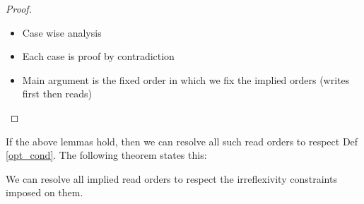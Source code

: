         \begin{proof}
            \begin{itemize}
                \item Case wise analysis
                \item Each case is proof by contradiction
                \item Main argument is the fixed order in which we fix the implied orders (writes first then reads)
            \end{itemize}    
        \end{proof}

        If the above lemmas hold, then we can resolve all such read orders to respect Def \ref{opt_cond}.
        The following theorem states this:
        \begin{theorem}
            \label{fwdprog-iro}
            We can resolve all implied read orders to respect the irreflexivity constraints imposed on them.
        \end{theorem}

